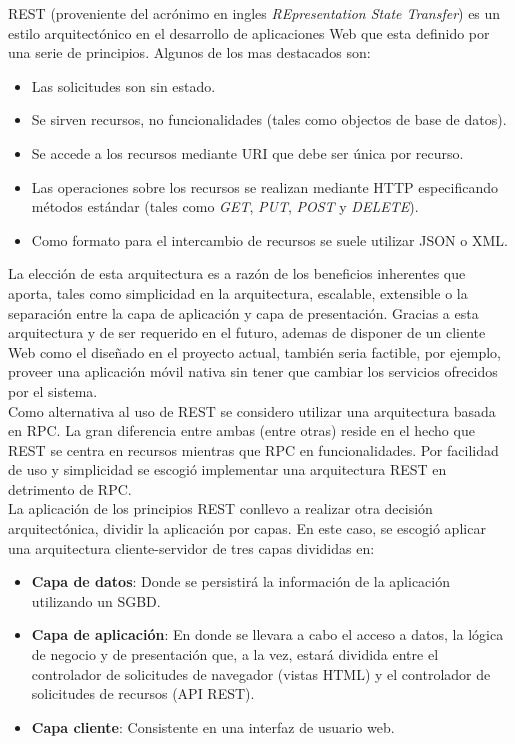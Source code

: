 \documentclass[11pt,a4paper]{article}
\begin{document}
REST (proveniente del acrónimo en ingles \textit{REpresentation State Transfer}) es un estilo arquitectónico en el desarrollo de aplicaciones Web que esta definido por una serie de principios. Algunos de los mas destacados son:
\begin{itemize}
\item Las solicitudes son sin estado.
\item Se sirven recursos, no funcionalidades (tales como objectos de base de datos).
\item Se accede a los recursos mediante URI que debe ser única por recurso.
\item Las operaciones sobre los recursos se realizan mediante HTTP especificando métodos estándar (tales como  \textit{GET}, \textit{PUT}, \textit{POST} y \textit{DELETE}).
\item Como formato para el intercambio de recursos se suele utilizar JSON o XML. 
\end{itemize}

La elección de esta arquitectura es a razón de los beneficios inherentes que aporta, tales como simplicidad en la arquitectura, escalable, extensible o la separación entre la capa de aplicación y capa de presentación. Gracias a esta arquitectura y de ser requerido en el futuro, ademas de disponer de un cliente Web como el diseñado en el proyecto actual, también seria factible, por ejemplo, proveer una aplicación móvil nativa sin tener que cambiar los servicios ofrecidos por el sistema.
\\

Como alternativa al uso de REST se considero utilizar una arquitectura basada en RPC. La gran diferencia entre ambas (entre otras) reside en el hecho que REST se centra en recursos mientras que RPC en funcionalidades. Por facilidad de uso y simplicidad se escogió implementar una arquitectura REST en detrimento de RPC.
\\

La aplicación de los principios REST conllevo a realizar otra decisión arquitectónica, dividir la aplicación por capas. En este caso, se escogió aplicar una arquitectura cliente-servidor de tres capas divididas en: 
\begin{itemize}
\item \textbf{Capa de datos}: Donde se persistirá la información de la aplicación utilizando un SGBD.
\item \textbf{Capa de aplicación}: En donde se llevara a cabo el acceso a datos, la lógica de negocio y de presentación que, a la vez, estará dividida entre el controlador de solicitudes de navegador (vistas HTML) y el controlador de solicitudes de recursos (API REST).
\item \textbf{Capa cliente}: Consistente en una interfaz de usuario web.
\end{itemize}
\end{document}
